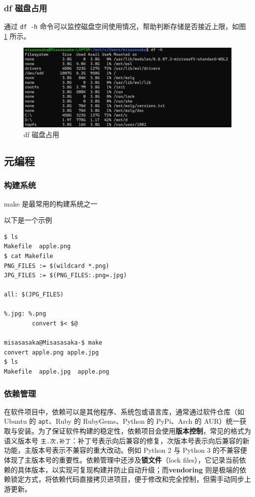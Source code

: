 \documentclass[a4paper,12pt]{ctexart}
\begin{document}
\subsubsection{df 磁盘占用}
通过 \texttt{df -h} 命令可以监控磁盘空间使用情况，帮助判断存储是否接近上限，如图 \ref{fig:df} 所示。
\begin{figure}[htbp]
  \centering
  \includegraphics[width=0.9\linewidth]{df.jpg}
  \caption{df 磁盘占用}
  \label{fig:df}
\end{figure}


\newpage

\subsection{元编程}

\subsubsection{构建系统}
make 是最常用的构建系统之一

以下是一个示例

\begin{lstlisting}
$ ls
Makefile  apple.png
$ cat Makefile
PNG_FILES := $(wildcard *.png)
JPG_FILES := $(PNG_FILES:.png=.jpg)

all: $(JPG_FILES)

%.jpg: %.png
        convert $< $@

misasasaka@Misasasaka-$ make
convert apple.png apple.jpg
$ ls
Makefile  apple.jpg  apple.png
\end{lstlisting}

\subsubsection{依赖管理}

在软件项目中，依赖可以是其他程序、系统包或语言库，通常通过软件仓库（如 Ubuntu 的 \texttt{apt}、Ruby 的 RubyGems、Python 的 PyPi、Arch 的 AUR）统一获取与安装。为了保证软件构建的稳定性，依赖项目会使用\textbf{版本控制}，常见的格式为语义版本号 \texttt{主.次.补丁}：补丁号表示向后兼容的修复，次版本号表示向后兼容的新功能，主版本号表示不兼容的重大改动。例如 Python 2 与 Python 3 的不兼容便体现了主版本号的重要性。依赖管理中还涉及\textbf{锁文件}（lock files），它记录当前依赖的具体版本，以实现可复现构建并防止自动升级；而\textbf{vendoring} 则是极端的依赖锁定方式，将依赖代码直接拷贝进项目，便于修改和完全控制，但需手动同步上游更新。
\end{document}
